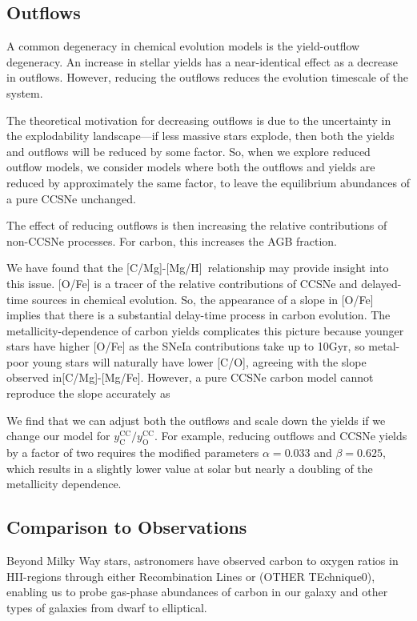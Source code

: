 \documentclass[fleqn,usenatbib]{mnras}
\newcommand{\caah}{[C/Mg]-[Mg/H]}
\newcommand{\caafe}{[C/Mg]-[Mg/Fe]}
\begin{document}
\subsection{Outflows}
A common degeneracy in chemical evolution models is the yield-outflow degeneracy. An increase in stellar yields has a near-identical effect as a decrease in outflows. However, reducing the outflows reduces the evolution timescale of the system. 

The theoretical motivation for decreasing outflows is due to the uncertainty in the explodability landscape---if less massive stars explode, then both the yields and outflows will be reduced by some factor. So, when we explore reduced outflow models, we consider models where both the outflows and yields are reduced by approximately the same factor, to leave the equilibrium abundances of a pure CCSNe unchanged. 

The effect of reducing outflows is then increasing the relative contributions of non-CCSNe processes. For carbon, this increases the AGB fraction.

We have found that the \caah~relationship may provide insight into this issue. [O/Fe] is a tracer of the relative contributions of CCSNe and delayed-time sources in chemical evolution. So, the appearance of a slope in [O/Fe] implies that there is a substantial delay-time process in carbon evolution. 
The metallicity-dependence of carbon yields complicates this picture because
younger stars have higher [O/Fe] as the SNeIa contributions take up to 10Gyr,
so metal-poor young stars will naturally have lower [C/O], agreeing with the
slope observed in\caafe. However, a pure CCSNe carbon model cannot reproduce the slope accurately as  


We find that we can adjust both the outflows and scale down the yields if we change our model for $y_\text{C}^\text{CC}/y_\text{O}^\text{CC}$. For example, reducing outflows and CCSNe yields by a factor of two requires the modified parameters
$\alpha = 0.033$ and $\beta = 0.625$, which results in a slightly lower value at solar but nearly a doubling of the metallicity dependence.


\subsection{Comparison to Observations}

Beyond Milky Way stars, astronomers have observed carbon to oxygen ratios in
HII-regions through either Recombination Lines or (OTHER TEchnique0), enabling
us to probe gas-phase abundances of carbon in our galaxy and other types of
galaxies from dwarf to elliptical. 
\end{document}
